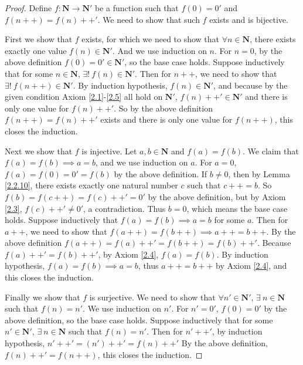 \begin{proof}
    Define \(f : \mathbf{N} \to \mathbf{N}'\) be a function such that \(f(0) = 0'\) and \(f(n++) = f(n)++'\).
    We need to show that such \(f\) exists and is bijective.

    First we show that \(f\) exists, for which we need to show that \(\forall n \in \mathbf{N}\), there exists exactly one value \(f(n) \in \mathbf{N}'\).
    And we use induction on \(n\).
    For \(n = 0\), by the above definition \(f(0) = 0' \in \mathbf{N}'\), so the base case holds.
    Suppose inductively that for some \(n \in \mathbf{N}\), \(\exists!\ f(n) \in \mathbf{N}'\).
    Then for \(n++\), we need to show that \(\exists!\ f(n++) \in \mathbf{N}'\).
    By induction hypothesis, \(f(n) \in \mathbf{N}'\), and because by the given condition Axiom \ref{2.1}-\ref{2.5} all hold on \(\mathbf{N}'\), \(f(n)++' \in \mathbf{N}'\) and there is only one value for \(f(n)++'\).
    So by the above definition \(f(n++) = f(n)++'\) exists and there is only one value for \(f(n++)\), this closes the induction.

    Next we show that \(f\) is injective.
    Let \(a, b \in \mathbf{N}\) and \(f(a) = f(b)\).
    We claim that \(f(a) = f(b) \implies a = b\), and we use induction on \(a\).
    For \(a = 0\), \(f(a) = f(0) = 0' = f(b)\) by the above definition.
    If \(b \neq 0\), then by Lemma \ref{2.2.10}, there exists exactly one natural number \(c\) such that \(c++ = b\).
    So \(f(b) = f(c++) = f(c)++' = 0'\) by the above definition, but by Axiom \ref{2.3}, \(f(c)++' \neq 0'\), a contradiction.
    Thus \(b = 0\), which means the base case holds.
    Suppose inductively that \(f(a) = f(b) \implies a = b\) for some \(a\).
    Then for \(a++\), we need to show that \(f(a++) = f(b++) \implies a++ = b++\).
    By the above definition \(f(a++) = f(a)++' = f(b++) = f(b)++'\).
    Because \(f(a)++' = f(b)++'\), by Axiom \ref{2.4}, \(f(a) = f(b)\).
    By induction hypothesis, \(f(a) = f(b) \implies a = b\), thus \(a++ = b++\) by Axiom \ref{2.4}, and this closes the induction.

    Finally we show that \(f\) is surjective.
    We need to show that \(\forall n' \in \mathbf{N}'\), \(\exists\ n \in \mathbf{N}\) such that \(f(n) = n'\).
    We use induction on \(n'\).
    For \(n' = 0'\), \(f(0) = 0'\) by the above definition, so the base case holds.
    Suppose inductively that for some \(n' \in \mathbf{N}'\), \(\exists\ n \in \mathbf{N}\) such that \(f(n) = n'\).
    Then for \(n'++'\), by induction hypothesis, \(n'++' = (n')++' = f(n)++'\)
    By the above definition, \(f(n)++' = f(n++)\), this closes the induction.
\end{proof}